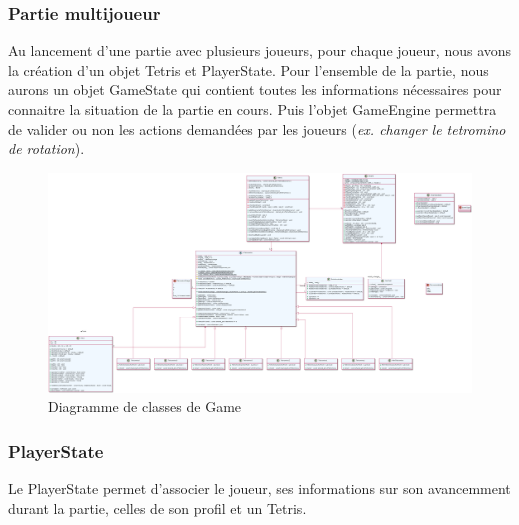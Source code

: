 \documentclass{article}
\begin{document}
\subsubsection{Partie multijoueur}

Au lancement d'une partie avec plusieurs joueurs, pour chaque joueur, nous avons la création d'un objet Tetris et PlayerState. Pour l'ensemble de la partie, nous aurons un objet GameState qui contient toutes les informations nécessaires pour connaitre la situation de la partie en cours. Puis l'objet GameEngine permettra de valider ou non les actions demandées par les joueurs (\textit{ex. changer le tetromino de rotation}).

\newpage

\begin{figure}[H]
	\centering
	 \includegraphics[scale=0.2, angle=90]{../res/uml/class/GameClass.png}
	 \caption{Diagramme de classes de Game}
	 \label{fig:GameClassDiagram}
\end{figure}


\subsubsection*{PlayerState}

Le PlayerState permet d'associer le joueur, ses informations sur son avancemment durant la partie, celles de son profil et un Tetris.
\end{document}

